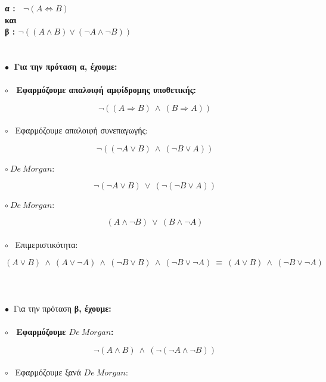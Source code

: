 \documentclass[10pt]{article}
\begin{document}
\hspace{10mm} \bf α \normalfont : \ $\neg(A \Leftrightarrow B)$ \\

\hspace{25mm} και \\

\hspace{10mm} \bf β \normalfont : $\neg((A \wedge B) \vee (\neg A \wedge \neg B)) $ \\ \\ \\
$\bullet \ $ Για την πρόταση \bf α\normalfont , έχουμε: \\ \\

$\circ$ \ Εφαρμόζουμε απαλοιφή αμφίδρομης υποθετικής:

\[
\neg((A \Rightarrow B) \ \wedge \ (B \Rightarrow A))
\] \\

$\circ$ \ Εφαρμόζουμε απαλοιφή συνεπαγωγής:

\[
\neg((\neg A \vee B) \ \wedge \ (\neg B \vee A))
\] \\

$\circ \ De \ Morgan: $

\[
\neg(\neg A \vee B) \ \vee \ (\neg(\neg B \vee A))
\] \\

$\circ \ De \ Morgan: $

\[
( A \wedge  \neg B) \ \vee \ ( B \wedge \neg A)
\] \\

$\circ$ \ Επιμεριστικότητα:

\[
( A \vee B) \ \wedge \ ( A \vee  \neg A) \ \wedge \ ( \neg B \vee B) \ \wedge \ ( \neg B \vee \neg A) \ \equiv \ ( A \vee B) \ \wedge \ ( \neg B \vee \neg A)
\] \\ \\ \\
$\bullet \ $ Για την πρόταση \bf β\normalfont , έχουμε: \\ \\

$\circ$ \ Εφαρμόζουμε $De \ Morgan$:

\[
\neg(A \wedge B) \ \wedge \ (\neg(\neg A \wedge \neg B))
\] \\

$\circ$ \ Εφαρμόζουμε ξανά $De \ Morgan$:
\end{document}
